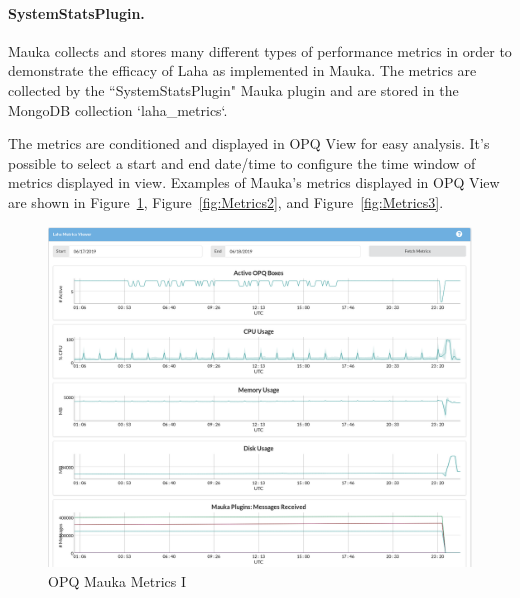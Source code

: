 \paragraph{SystemStatsPlugin.}\label{lbl:SystemStatsPlugin}
Mauka collects and stores many different types of performance metrics in order to demonstrate the efficacy of Laha as implemented in Mauka. The metrics are collected by the ``SystemStatsPlugin" Mauka plugin and are stored in the MongoDB collection `laha\_metrics`.

The metrics are conditioned and displayed in OPQ View for easy analysis. It's possible to select a start and end date/time to configure the time window of metrics displayed in view. Examples of Mauka's metrics displayed in OPQ View are shown in Figure~\ref{fig:Metrics1}, Figure~\ref{fig:Metrics2}, and Figure~\ref{fig:Metrics3}.

\begin{figure}
	\centering
	\includegraphics[width=\linewidth]{figures/metrics_1.png}
	\caption{OPQ Mauka Metrics I}
	\label{fig:Metrics1}
\end{figure}

